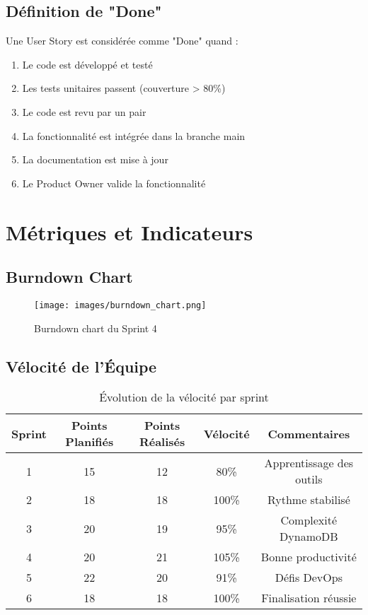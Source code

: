 \subsection{Définition de "Done"}

Une User Story est considérée comme "Done" quand :
\begin{enumerate}
    \item Le code est développé et testé
    \item Les tests unitaires passent (couverture > 80\%)
    \item Le code est revu par un pair
    \item La fonctionnalité est intégrée dans la branche main
    \item La documentation est mise à jour
    \item Le Product Owner valide la fonctionnalité
\end{enumerate}

\section{Métriques et Indicateurs}

\subsection{Burndown Chart}

\begin{figure}[H]
    \centering
    \texttt{[image: images/burndown\_chart.png]}
    \caption{Burndown chart du Sprint 4}
    \label{fig:burndown_chart}
\end{figure}

\subsection{Vélocité de l'Équipe}

\begin{table}[H]
    \centering
    \begin{tabularx}{\textwidth}{|c|c|c|c|c|}
        \hline
        \textbf{Sprint} & \textbf{Points Planifiés} & \textbf{Points Réalisés} & \textbf{Vélocité} & \textbf{Commentaires} \\
        \hline
        1 & 15 & 12 & 80\% & Apprentissage des outils \\
        \hline
        2 & 18 & 18 & 100\% & Rythme stabilisé \\
        \hline
        3 & 20 & 19 & 95\% & Complexité DynamoDB \\
        \hline
        4 & 20 & 21 & 105\% & Bonne productivité \\
        \hline
        5 & 22 & 20 & 91\% & Défis DevOps \\
        \hline
        6 & 18 & 18 & 100\% & Finalisation réussie \\
        \hline
    \end{tabularx}
    \caption{Évolution de la vélocité par sprint}
    \label{tab:velocity_evolution}
\end{table}

